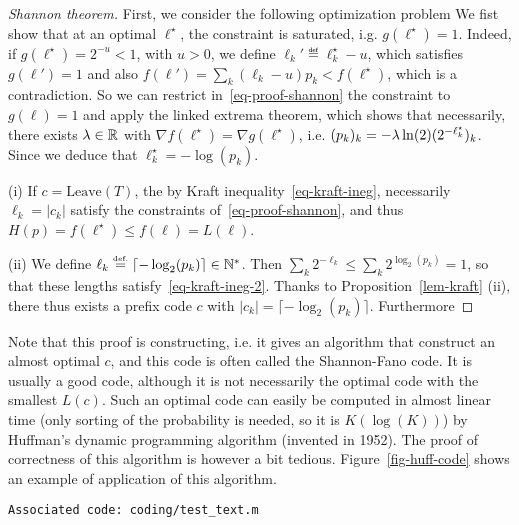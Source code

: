 \begin{proof}[Shannon theorem]
	First, we consider the following optimization problem
	We fist show that at an optimal $\ell^\star$, the constraint is saturated, i.g. $g(\ell^\star)=1$. Indeed, if $g(\ell^\star)=2^{-u} < 1$, with $u>0$, we define $\ell_k' \eqdef \ell_k^\star-u$, which satisfies $g(\ell') = 1$ and also $f(\ell')=\sum_k (\ell_k-u) p_k < f(\ell^\star)$, which is a contradiction.
	So we can restrict in~\eqref{eq-proof-shannon} the constraint to $g(\ell)=1$ and apply the linked extrema theorem, which shows that necessarily, there exists $\lambda \in \mathbb{R}$ with $\nabla f(\ell^\star)=\nabla g(\ell^\star)$, i.e.  $(p_k)_k = -\lambda \ln(2) (2^{-\ell_k^\star})_k$. Since 
	we deduce that $\ell^\star_k = -\log(p_k)$. 
	
	(i) If $c=\text{Leave}(T)$, the by Kraft inequality~\eqref{eq-kraft-ineg}, necessarily $\ell_k=|c_k|$ satisfy the constraints of~\eqref{eq-proof-shannon}, and thus $H(p) = f(\ell^\star) \leq f(\ell) = L(\ell)$.
	
	(ii) We define $\ell_k \stackrel{\mbox{\upshape\tiny def.}}{=} \lceil -\log_2(p_k) \rceil \in \mathbb{N}^*$. Then $\sum_k 2^{-\ell_k} \leq \sum_k 2^{\log_2(p_k)} = 1$, so that these lengths satisfy~\eqref{eq-kraft-ineg-2}. Thanks to Proposition~\ref{lem-kraft} (ii), there thus exists a prefix code $c$ with $|c_k|=\lceil -\log_2(p_k) \rceil$. Furthermore
\end{proof}

Note that this proof is constructing, i.e. it gives an algorithm that construct an almost optimal $c$, and this code is often called the Shannon-Fano code. It is usually a good code, although it is not necessarily the optimal code with the smallest $L(c)$. Such an optimal code can easily be computed in almost linear time (only sorting of the probability is needed, so it is $K(\log(K))$) by Huffman's dynamic programming algorithm (invented in 1952). The proof of correctness of this algorithm is however a bit tedious. Figure~\ref{fig-huff-code} shows an example of application of this algorithm.


\texttt{Associated code: coding/test\_text.m}

